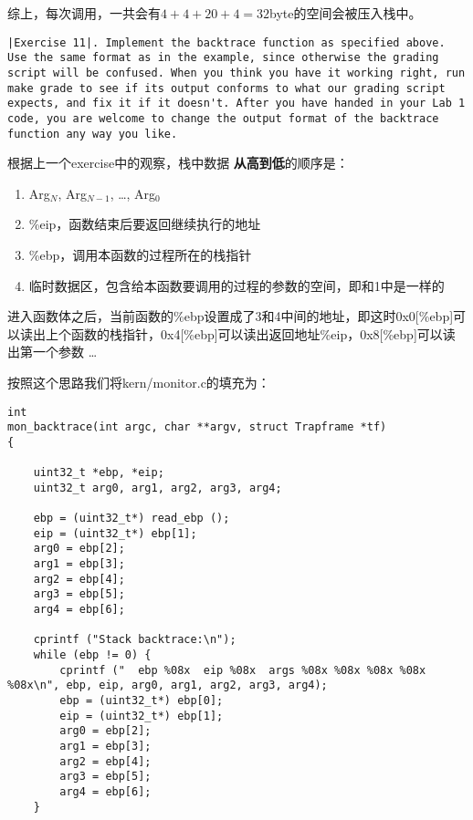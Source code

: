 \documentclass{article}
\newcommand{\highlight}[1]{{\bfseries \color{red}  #1}}
\begin{document}
\begin{CJK*}{UTF8}{gkai}
综上，每次调用，一共会有$4 + 4 + 20 + 4 = 32$byte的空间会被压入栈中。

\vspace{4em}

\begin{lstlisting}[style=exercise]
|Exercise 11|. Implement the backtrace function as specified above. Use the same format as in the example, since otherwise the grading script will be confused. When you think you have it working right, run make grade to see if its output conforms to what our grading script expects, and fix it if it doesn't. After you have handed in your Lab 1 code, you are welcome to change the output format of the backtrace function any way you like.
\end{lstlisting}

根据上一个exercise中的观察，栈中数据\highlight{从高到低}的顺序是：

\begin{enumerate}
    \item{Arg$_N$, Arg$_{N - 1}$, \dots, Arg$_0$}
    \item{\%eip，函数结束后要返回继续执行的地址}
    \item{\%ebp，调用本函数的过程所在的栈指针}
    \item{临时数据区，包含给本函数要调用的过程的参数的空间，即和1中是一样的}
\end{enumerate}

进入函数体之后，当前函数的\%ebp设置成了3和4中间的地址，即这时0x0[\%ebp]可以读出上个函数的栈指针，0x4[\%ebp]可以读出返回地址\%eip，0x8[\%ebp]可以读出第一个参数 \ldots

按照这个思路我们将kern/monitor.c的填充为：

\begin{lstlisting}[style=ccode, title={\scriptsize \ttfamily \bfseries kern/monitor.c}]
int
mon_backtrace(int argc, char **argv, struct Trapframe *tf)
{

    uint32_t *ebp, *eip;
    uint32_t arg0, arg1, arg2, arg3, arg4;

    ebp = (uint32_t*) read_ebp ();
    eip = (uint32_t*) ebp[1];
    arg0 = ebp[2];
    arg1 = ebp[3];
    arg2 = ebp[4];
    arg3 = ebp[5];
    arg4 = ebp[6];

    cprintf ("Stack backtrace:\n");
    while (ebp != 0) {
        cprintf ("  ebp %08x  eip %08x  args %08x %08x %08x %08x %08x\n", ebp, eip, arg0, arg1, arg2, arg3, arg4);
        ebp = (uint32_t*) ebp[0];
        eip = (uint32_t*) ebp[1];
        arg0 = ebp[2];
        arg1 = ebp[3];
        arg2 = ebp[4];
        arg3 = ebp[5];
        arg4 = ebp[6];
    }
	

\end{lstlisting}
\end{CJK*}
\end{document}
